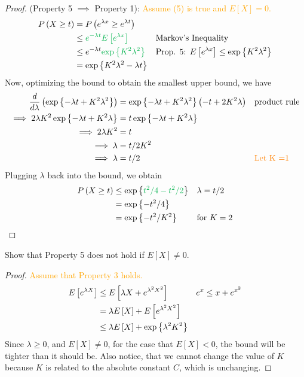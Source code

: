\begin{proof}
(Property 5 $\implies$ Property 1): \textcolor{orange}{Assume (5) is true and $E[X]=0.$}
\begin{align*}
    \Prob{X \geq t} &= \Prob{e^{\lambda x} \geq e^{\lambda t}} && \text{} \\
    &\leq \textcolor{\dgreen}{e^{-\lambda t} \Expect{e^{\lambda x}}} &&
        \text{Markov's Inequality} \\ 
    &\leq e^{-\lambda t} \textcolor{\dgreen}{\exponential{K^2 \lambda^2}} &&
        \text{Prop. 5: $\Expect{e^{\lambda x}} \leq \exponential{K^2 \lambda^2}$} \\ 
    &= \exponential{K^2 \lambda^2 - \lambda t} 
\end{align*}
Now, optimizing the bound to obtain the smallest upper bound, we have 
\begin{align*}
    \frac{d}{d \lambda} \left(\exp\left\{-\lambda t + K^2 \lambda^2  \right\}\right) &= \exp\left\{-\lambda t + K^2\lambda^2 \right\} \left( -t + 2K^2 \lambda \right) && \text{product rule} \\  
    \implies 2 \lambda K^2 \exp\left\{-\lambda t + K^2 \lambda \right\} &= t \exp\left\{-\lambda t + K^2 \lambda \right\} \\ 
    \implies 2 \lambda K^2 &= t   \\
    \implies \lambda &= t/2K^2 \\ 
    \implies \lambda &= t/2 && \text{\textcolor{orange}{Let K =1}}
\end{align*}
Plugging $\lambda$ back into the bound, we obtain
\begin{align*}
    \Prob{X \geq t} &\leq \exponential{\textcolor{\dgreen}{t^2/4 - t^2/2}} && \text{$\lambda = t/2$} \\ 
    &= \exponential{-t^2/4} \\
    &= \exponential{-t^2/K^2} && \text{for $K = 2$} 
\end{align*}
\end{proof}

\begin{tcolorbox}
\begin{example}
Show that Property 5 does not hold if $E[X] \neq 0.$ \\ 
\end{example}
\end{tcolorbox}
\begin{proof}
\textcolor{orange}{Assume that Property 3 holds. } 
\begin{align*}
    E\left[e^{\lambda X} \right] &\leq E\left[\lambda X + e^{\lambda^2 X^2} \right] && 
        \text{$e^x \leq x + e^{x^2}$} \\ 
    &= \lambda E\left[X \right] + E\left[e^{\lambda^2 X^2} \right] && \text{} \\
    &\leq \lambda E\left[X \right] + \exp\left\{\lambda^2 K^2 \right\}
\end{align*}
Since $\lambda \geq 0$, and $E[X] \neq 0$, for the case that $E[X] < 0$, the bound will be tighter than it should be. Also notice, that we cannot change the value of $K$ because $K$ is related to the absolute constant $C$, which is unchanging. 
\end{proof}



